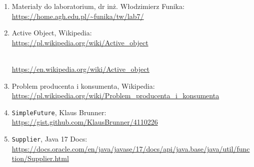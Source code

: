 \documentclass[11pt]{article}
\begin{document}
\begin{enumerate}
\def\labelenumi{\arabic{enumi}.}
\item
  Materiały do laboratorium, dr inż. Włodzimierz Funika:\\
  \url{https://home.agh.edu.pl/~funika/tw/lab7/}
\item
  Active Object, Wikipedia:\\
  \url{https://pl.wikipedia.org/wiki/Active_object}\strut \\
  \url{https://en.wikipedia.org/wiki/Active_object}
\item
  Problem producenta i konsumenta, Wikipedia:\\
  \url{https://pl.wikipedia.org/wiki/Problem_producenta_i_konsumenta}
\item
  \texttt{SimpleFuture}, Klaus Brunner:\\
  \url{https://gist.github.com/KlausBrunner/4110226}
\item
  \texttt{Supplier}, Java 17 Docs:\\
  \url{https://docs.oracle.com/en/java/javase/17/docs/api/java.base/java/util/function/Supplier.html}
\end{enumerate}


    
    
    
\end{document}
